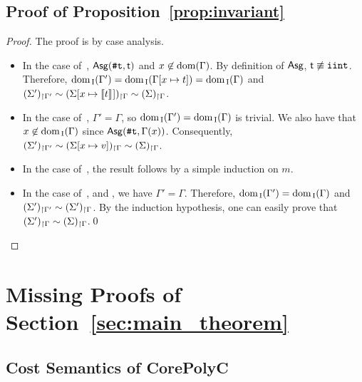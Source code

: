\documentclass[runningheads]{llncs}
\begin{document}
\subsection{Proof of Proposition~\ref{prop:invariant}}
\begin{proof}
The proof is by case analysis.
\begin{itemize}
    \item In the case of~, $\mathsf{Asg}(\texttt{\#}\mathtt{t},\mathsf{t})$ and $x\not\in\mathrm{dom}(\Gamma)$. By definition of $\mathsf{Asg}$, $\mathsf{t}\not\equiv\mathtt{iint}$. Therefore, $\mathrm{dom}_{\mathrm{\,I}}(\Gamma')=\mathrm{dom}_{\mathrm{\,I}}(\Gamma[x\mapsto t])=\mathrm{dom}_{\mathrm{\,I}}(\Gamma)$ and ${(\Sigma')_{\restriction \Gamma'}}\sim{(\Sigma[x\mapsto \llbracket t\rrbracket_{}])_{\restriction \Gamma}}\sim{(\Sigma)_{\restriction \Gamma}}$.
    \item In the case of~, $\Gamma'=\Gamma$, so $\mathrm{dom}_{\mathrm{\,I}}(\Gamma')=\mathrm{dom}_{\mathrm{\,I}}(\Gamma)$ is trivial. We also have that $x\not\in\mathrm{dom}_{\mathrm{\,I}}(\Gamma)$ since $\mathsf{Asg}(\texttt{\#}\mathtt{t},\Gamma(x))$. Consequently, ${(\Sigma')_{\restriction \Gamma'}}\sim{(\Sigma[x\mapsto v])_{\restriction \Gamma}}\sim{(\Sigma)_{\restriction \Gamma}}$.
    \item In the case of~, the result follows by a simple induction on $m$.
    \item In the case of~,  and , we have $\Gamma'=\Gamma$.
    Therefore, $\mathrm{dom}_{\mathrm{\,I}}(\Gamma')=\mathrm{dom}_{\mathrm{\,I}}(\Gamma)$ and ${(\Sigma')_{\restriction \Gamma'}}\sim{(\Sigma')_{\restriction \Gamma}}$.
    By the induction hypothesis, one can easily prove that ${(\Sigma')_{\restriction \Gamma}}\sim{(\Sigma)_{\restriction \Gamma}}$.\qed
\end{itemize}
\end{proof}%

\section{Missing Proofs of Section~\ref{sec:main_theorem}}\label{app-soundness}

\subsection{Cost Semantics of CorePolyC}
\label{app:cost_semantics}
\end{document}
